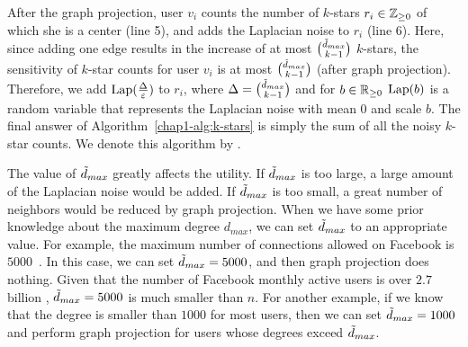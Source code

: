 After the graph projection, 
user $v_i$ 
counts the number of $k$-stars $r_i \in \mathbb{Z}_{\ge0}$ of which she is a center (line 5), and 
adds the Laplacian noise 
to 
$r_i$ 
(line 6). 
Here, since adding one edge results in the increase of at most $\binom{\tilde{d}_{max}}{k-1}$ $k$-stars, the 
sensitivity of 
$k$-star counts for user $v_i$ 
is at most $\binom{\tilde{d}_{max}}{k-1}$ (after graph projection). 
Therefore, we add $\textrm{Lap}(\frac{\Delta}{\varepsilon})$ to $r_i$, where $\Delta = \binom{\tilde{d}_{max}}{k-1}$ and 
for $b \in \mathbb{R}_{\ge0}$ 
$\textrm{Lap}(b)$ is a random variable that represents the Laplacian noise with mean $0$ and scale $b$. 
The final answer of Algorithm~\ref{chap1-alg:k-stars} is
simply the sum of all the noisy $k$-star counts. 
We denote this algorithm by .

The value of $\tilde{d}_{max}$ greatly affects the utility. 
If $\tilde{d}_{max}$ is too large, a large amount of the Laplacian noise would be added. 
If $\tilde{d}_{max}$ is too small, a great number of neighbors would be reduced by 
graph projection. 
When we have some prior knowledge about the maximum degree $d_{max}$, we can set $\tilde{d}_{max}$ to an appropriate value. 
For example, 
the maximum number of connections allowed on Facebook is $5000$~\cite{Facebook_Limit}. 
In this case, we can set $\tilde{d}_{max}=5000$, and then graph projection does nothing. 
Given that the number of Facebook monthly active users is over $2.7$ billion \cite{Facebook_reports20}, $\tilde{d}_{max}=5000$ is much smaller than $n$. 
For another example, 
if we know that the degree is smaller than $1000$ for most users, then we can set $\tilde{d}_{max} = 1000$ and perform graph projection for 
users whose degrees exceed $\tilde{d}_{max}$. 

